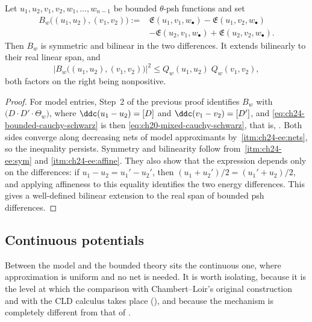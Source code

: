 \begin{corollary}
\label{cor:ch24-bounded-cauchy-schwarz}
Let $u_1,u_2,v_1,v_2,w_1,\ldots,w_{n-1}$ be bounded $\theta$-psh
functions and set
\[
 \begin{aligned}
 B_w\bigl((u_1,u_2),(v_1,v_2)\bigr)
 :={}&\mathfrak E(u_1,v_1,w_\bullet)-\mathfrak E(u_1,v_2,w_\bullet)\\
 &-\mathfrak E(u_2,v_1,w_\bullet)+\mathfrak E(u_2,v_2,w_\bullet).
 \end{aligned}
\]
Then $B_w$ is symmetric and bilinear in the two differences.
It extends bilinearly to their real linear span, and
\begin{equation}
\label{eq:ch24-bounded-cauchy-schwarz}
 \bigl|B_w\bigl((u_1,u_2),(v_1,v_2)\bigr)\bigr|^2
 \leq Q_w(u_1,u_2)\;Q_w(v_1,v_2),
\end{equation}
both factors on the right being nonpositive.
\end{corollary}

\begin{proof}
For model entries, Step~2 of the previous proof identifies
$B_w$ with $\bigl(D\cdot D'\cdot\Theta_w\bigr)$, where
$\ddc(u_1-u_2)=[D]$ and $\ddc(v_1-v_2)=[D']$, and
\eqref{eq:ch24-bounded-cauchy-schwarz} is then
\eqref{eq:ch20-mixed-cauchy-schwarz}, that is,
.  Both sides converge along decreasing
nets of model approximants by
\,\cref{itm:ch24-ee:nets}, so the inequality
persists.  Symmetry and bilinearity follow from
\,\cref{itm:ch24-ee:sym} and
\cref{itm:ch24-ee:affine}.  They also show that the expression depends
only on the differences: if $u_1-u_2=u_1'-u_2'$, then
$(u_1+u_2')/2=(u_1'+u_2)/2$, and applying affineness to this equality
identifies the two energy differences.  This gives a well-defined
bilinear extension to the real span of bounded psh differences.
\end{proof}

\subsection{Continuous potentials}
\label{sec:ch24-continuous}

Between the model and the bounded theory sits the continuous one, where
approximation is uniform and no net is needed.  It is worth isolating,
because it is the level at which the comparison with Chambert--Loir's
original construction and with the CLD calculus takes place
(), and because the mechanism is completely
different from that of .


